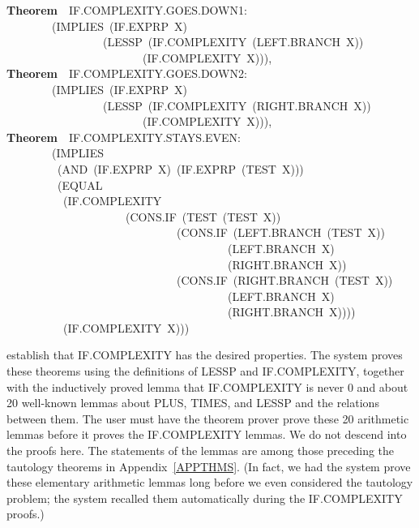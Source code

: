 \documentclass[10pt]{book}
\newenvironment{pubasis}{\begin{flushleft}}{\end{flushleft}}
\newcommand{\axiomordefinition}[1]{\vspace{6pt}\Large\textsf{\textbf{#1}}\normalsize}
\begin{document}
\begin{pubasis}
\axiomordefinition{Theorem}~~IF.COMPLEXITY.GOES.DOWN1:\\
~~~~~~~~(IMPLIES~(IF.EXPRP~X)\\
~~~~~~~~~~~~~~~~~(LESSP~(IF.COMPLEXITY~(LEFT.BRANCH~X))\\
~~~~~~~~~~~~~~~~~~~~~~~~(IF.COMPLEXITY~X))),\\

\axiomordefinition{Theorem}~~IF.COMPLEXITY.GOES.DOWN2:\\
~~~~~~~~(IMPLIES~(IF.EXPRP~X)\\
~~~~~~~~~~~~~~~~~(LESSP~(IF.COMPLEXITY~(RIGHT.BRANCH~X))\\
~~~~~~~~~~~~~~~~~~~~~~~~(IF.COMPLEXITY~X))),\\

\axiomordefinition{Theorem}~~IF.COMPLEXITY.STAYS.EVEN:\\
~~~~~~~~(IMPLIES\\
~~~~~~~~~(AND~(IF.EXPRP~X)~(IF.EXPRP~(TEST~X)))\\
~~~~~~~~~(EQUAL\\
~~~~~~~~~~(IF.COMPLEXITY\\
~~~~~~~~~~~~~~~~~~~~~(CONS.IF~(TEST~(TEST~X))\\
~~~~~~~~~~~~~~~~~~~~~~~~~~~~~~(CONS.IF~(LEFT.BRANCH~(TEST~X))\\
~~~~~~~~~~~~~~~~~~~~~~~~~~~~~~~~~~~~~~~(LEFT.BRANCH~X)\\
~~~~~~~~~~~~~~~~~~~~~~~~~~~~~~~~~~~~~~~(RIGHT.BRANCH~X))\\
~~~~~~~~~~~~~~~~~~~~~~~~~~~~~~(CONS.IF~(RIGHT.BRANCH~(TEST~X))\\
~~~~~~~~~~~~~~~~~~~~~~~~~~~~~~~~~~~~~~~(LEFT.BRANCH~X)\\
~~~~~~~~~~~~~~~~~~~~~~~~~~~~~~~~~~~~~~~(RIGHT.BRANCH~X))))\\
~~~~~~~~~~(IF.COMPLEXITY~X)))\\
\end{pubasis}
establish that IF.COMPLEXITY has the desired properties.  The system proves these
theorems using the definitions of LESSP and IF.COMPLEXITY,
together with the inductively proved lemma that IF.COMPLEXITY is never 0
and about 20 well-known lemmas about PLUS, TIMES,
and LESSP and the relations between them.
The user must have the theorem prover prove these 20 arithmetic
lemmas before it proves the IF.COMPLEXITY lemmas.  We do not descend into
the proofs here.  The statements of the lemmas are among those preceding
the tautology theorems in Appendix~\ref{APPTHMS}.  (In fact, we had the system
prove these elementary arithmetic lemmas long before we even considered
the tautology problem; the system recalled them automatically during
the IF.COMPLEXITY proofs.)
\end{document}
